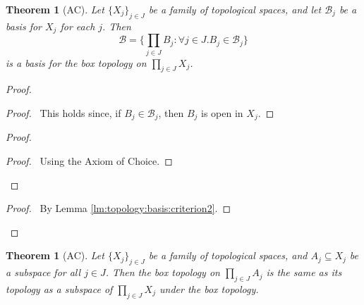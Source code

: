 \documentclass{book}
\newtheorem{thm}[lm]{Theorem}
\theoremstyle{definition}
\begin{document}
  \begin{thm}[AC]
    Let $\{ X_j \}_{j \in J}$ be a family of topological spaces, and let 
    $\mathcal{B}_j$ be a basis for $X_j$ for each $j$. Then
    \[ \mathcal{B} = \{ \prod_{j \in J} B_j : \forall j \in J. B_j \in 
    \mathcal{B}_j \} \]
    is a basis for the box topology on $\prod_{j \in J} X_j$.
  \end{thm}
  
  \begin{proof}
    \begin{proof}
      \pf\ This holds since, if $B_j \in \mathcal{B}_j$, then $B_j$ is open in 
      $X_j$.
    \end{proof}
    \begin{proof}
      \begin{proof}
        \pf\ Using the Axiom of Choice.
      \end{proof}
    \end{proof}
    \qedstep
    \begin{proof}
      \pf\ By Lemma \ref{lm:topology:basis:criterion2}.
    \end{proof}
  \end{proof}
  
  \begin{thm}[AC]
    Let $\{ X_j \}_{j \in J}$ be a family of topological spaces, and $A_j 
    \subseteq X_j$ be a subspace for all $j \in J$. Then the box topology on 
    $\prod_{j \in J} A_j$ is the same as its topology as a subspace of 
    $\prod_{j 
      \in J} X_j$ under the box topology.
  \end{thm}
  
\end{document}
